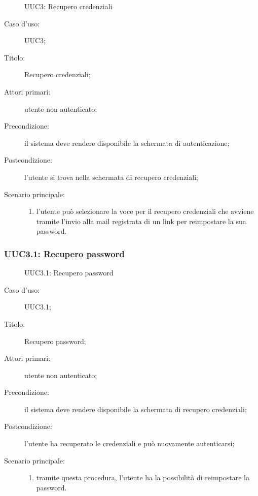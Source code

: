 \documentclass[../../../analisi-dei-requisiti.tex]{subfiles}
\begin{document}
\begin{figure}[H]
  \centering
  \caption{UUC3: Recupero credenziali}%
  \label{fig:uuc3}
\end{figure}

\begin{description}
  \item[Caso d’uso:] UUC3;
  \item[Titolo:] Recupero credenziali;
  \item[Attori primari:] utente non autenticato;
  \item[Precondizione:] il sistema deve rendere disponibile la schermata di autenticazione;
  \item[Postcondizione:] l'utente si trova nella schermata di recupero credenziali;
  \item[Scenario principale:]
        \begin{enumerate}
          \item l’utente può selezionare la voce per il recupero credenziali che avviene tramite l'invio alla mail registrata di un link per reimpostare la sua password.
        \end{enumerate}
\end{description}

\subsubsection{UUC3.1: Recupero password}%
\label{subs:UUC3.1}

\begin{figure}[H]
  \centering
  \caption{UUC3.1: Recupero password}%
  \label{fig:uuc3_1}
\end{figure}

\begin{description}
  \item[Caso d’uso:] UUC3.1;
  \item[Titolo:] Recupero password;
  \item[Attori primari:] utente non autenticato;
  \item[Precondizione:] il sistema deve rendere disponibile la schermata di recupero credenziali;
  \item[Postcondizione:] l'utente ha recuperato le credenziali e può nuovamente autenticarsi;
  \item[Scenario principale:]
        \begin{enumerate}
          \item tramite questa procedura, l’utente ha la possibilità di reimpostare la password.
        \end{enumerate}
\end{description}
\end{document}

